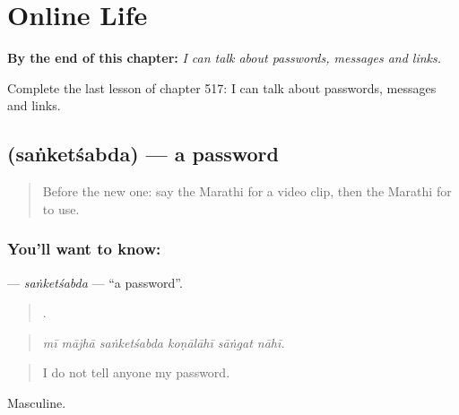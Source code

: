 
\chapter{Online Life}
\label{ch:mr-online-life}

\begin{chapteropening}
\textbf{By the end of this chapter:} \emph{I can talk about passwords, messages and links.}

Complete the last lesson of chapter 517: I can talk about passwords, messages and links.
\end{chapteropening}

\section[\texorpdfstring{\mr{संकेतशब्द} (saṅketśabda)}{संकेतशब्द (saṅketśabda)}]{ (saṅketśabda) — a password}

\label{lesson:MR-C517-sanketsabda}



\begin{quote}
Before the new one: say the Marathi for a video clip, then the Marathi for to use.
\end{quote}

\subsection*{You'll want to know: }
\textbf{} — \emph{saṅketśabda} — \textquotedblleft{}a password\textquotedblright{}.

\begin{quote}
     .
\end{quote}

\begin{quote}
\emph{mī mājhā saṅketśabda koṇālāhī sāṅgat nāhī.}
\end{quote}

\begin{quote}
I do not tell anyone my password.
\end{quote}

Masculine.

